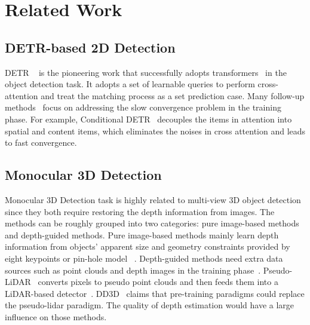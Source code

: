 \documentclass[10pt,twocolumn,letterpaper]{article}
\begin{document}
\section{Related Work}
\subsection{DETR-based 2D Detection}
DETR ~\cite{carion2020end} is the pioneering work that successfully adopts transformers~\cite{vaswani2017attention} in the object detection task. It adopts a set of learnable queries to perform cross-attention and treat the matching process as a set prediction case. Many follow-up methods~\cite{zhu2020deformable, chen2022group, wang2022anchor, liu2022dab, li2022dn} focus on addressing the slow convergence problem in the training phase. 
For example, 
Conditional DETR~\cite{meng2021conditional} decouples the items in attention into spatial and content items, which eliminates the noises in cross attention and leads to fast convergence.


\subsection{Monocular 3D Detection}
Monocular 3D Detection task is highly related to multi-view 3D object detection since they both require restoring the depth information from images.  
The methods can be roughly grouped into two categories: pure image-based methods and depth-guided methods. Pure image-based methods mainly learn depth information from objects' apparent size and geometry constraints provided by eight keypoints or pin-hole model ~\cite{brazil2019m3d,mousavian20173d, li2020rtm3d,li2019gs3d,lian2021geometry,liu2022learning,wang2021depth,lu2021GUPNet}. 
Depth-guided methods need extra data sources such as point clouds and depth images in the training phase~\cite{CaDDN, ye2020monocular, ma2020rethinking, qian2020end, chong2021monodistill}. Pseudo-LiDAR~\cite{wang2019pseudo} converts pixels to pseudo point clouds and then feeds them into a LiDAR-based detector~\cite{shi2019pointrcnn, liu2020tanet, ye2020monocular,deng2021voxel}. DD3D~\cite{park2021pseudo} claims that pre-training paradigms could replace the pseudo-lidar paradigm. The quality of depth estimation would have a large influence on those methods.
   
\end{document}
